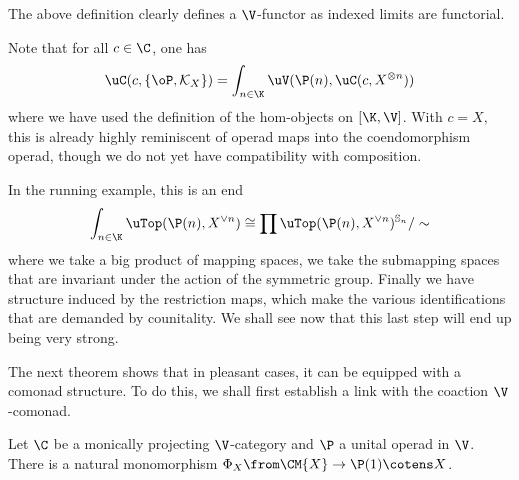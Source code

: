 \documentclass{tac}
\renewcommand{\S}{{\mathbb S}}
\begin{document}
The above definition clearly defines a $\V$-functor as indexed limits are functorial. 
\begin{remark}
\label{rewrite}
    Note that for all $c \in \C$, one has
    $$
    \uC(c, \{\oP, \mathcal K_X \}) = \int_{n \in \K} \uV(\P(n), \uC(c, X^{\otimes n}))
    $$
    where we have used the definition of the hom-objects on $[\K, \V]$. With $c=X,$ this is already highly reminiscent of operad maps into the coendomorphism operad, though we do not yet have compatibility with composition.
\end{remark}
\begin{example}
In the running example, this is an end
$$
\int_{n \in \K} \uTop (\P(n), X^{\vee n}) \cong \prod \uTop (\P(n), X^{\vee n})^{\S_n} / \sim
$$
where we take a big product of mapping spaces, we take the submapping spaces that are invariant under the action of the symmetric group. Finally we have structure induced by the restriction maps, which make the various identifications that are demanded by counitality.  We shall see now that this last step will end up being very strong.
\end{example}
The next theorem shows that in pleasant cases, it can be equipped with a comonad structure. To do this, we shall first establish a link with the coaction $\V$-comonad.
\begin{proposition}
\label{prop:mono}
    Let $\C$ be a monically projecting $\V$-category and $\P$ a unital operad in $\V$. There is a natural monomorphism $\Phi_X \from \CM{X} \to \P(1) \cotens X$. 
\end{proposition}
\end{document}
